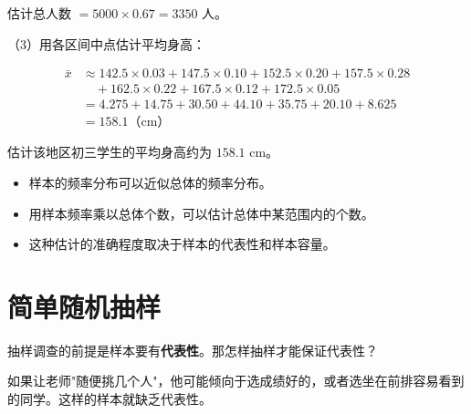 \begin{workedexamples}
估计总人数 $= 5000 \times 0.67 = 3350$ 人。

（3）用各区间中点估计平均身高：

\[
\begin{aligned}
\bar{x} &\approx 142.5 \times 0.03 + 147.5 \times 0.10 + 152.5 \times 0.20 + 157.5 \times 0.28 \\
&\quad + 162.5 \times 0.22 + 167.5 \times 0.12 + 172.5 \times 0.05 \\
&= 4.275 + 14.75 + 30.50 + 44.10 + 35.75 + 20.10 + 8.625 \\
&= 158.1 \text{（cm）}
\end{aligned}
\]


估计该地区初三学生的平均身高约为 $158.1$ cm。

\end{workedexamples}

\begin{keytakeaway}


\begin{itemize}
  \item 样本的频率分布可以近似总体的频率分布。
  \item 用样本频率乘以总体个数，可以估计总体中某范围内的个数。
  \item 这种估计的准确程度取决于样本的代表性和样本容量。
\end{itemize}


\end{keytakeaway}



\section*{简单随机抽样}


\begin{explore}


抽样调查的前提是样本要有\textbf{代表性}。那怎样抽样才能保证代表性？

如果让老师"随便挑几个人"，他可能倾向于选成绩好的，或者选坐在前排容易看到的同学。这样的样本就缺乏代表性。

\end{explore}

